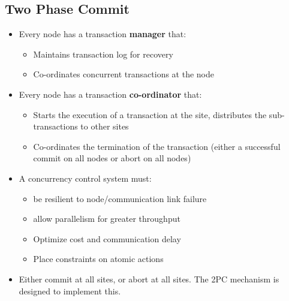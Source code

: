 \documentclass{article}
\begin{document}
\subsection{Two Phase Commit}
\begin{itemize}
    \item Every node has a transaction \textbf{manager} that:
    \begin{itemize}
        \item Maintains transaction log for recovery
        
        \item Co-ordinates concurrent transactions at the node
    \end{itemize}
    
    \item Every node has a transaction \textbf{co-ordinator} that:
    \begin{itemize}
        \item Starts the execution of a transaction at the site, distributes the sub-transactions to other sites
        
        \item Co-ordinates the termination of the transaction (either a successful commit on all nodes or abort on all nodes)
    \end{itemize}
    
    \item A concurrency control system must:
    \begin{itemize}
        \item be resilient to node/communication link failure
        
        \item allow parallelism for greater throughput
        
        \item Optimize cost and communication delay
        
        \item Place constraints on atomic actions
    \end{itemize}
    
    \item Either commit at all sites, or abort at all sites. The 2PC mechanism is designed to implement this.
\end{itemize}
\end{document}
